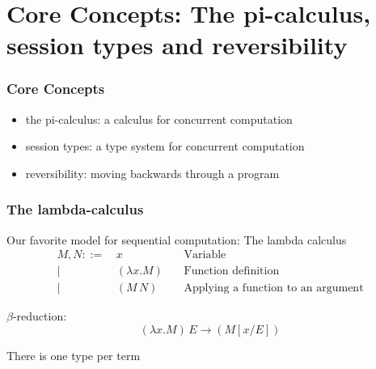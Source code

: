 \documentclass[12pt]{beamer}
\begin{document}
\section{Core Concepts: The pi-calculus, session types and reversibility}


\begin{frame}
\frametitle{Core Concepts}
\begin{center}


\begin{itemize}
    \item the pi-calculus: a calculus for concurrent computation
    \item session types: a type system for concurrent computation
    \item reversibility: moving backwards through a program
\end{itemize}


\end{center}
\end{frame}


\begin{frame}
\frametitle{The lambda-calculus}

Our favorite model for sequential computation: The lambda calculus 
\begingroup
\fontsize{10pt}{12pt}\selectfont
\begin{align*}
M, N ::= \, & x \,\,\, \, \, & \text{Variable}\\
|\,\,\, & (\lambda x. M) \,\,\, \, \, &\text{Function definition}\\
|\,\,\, & (M\, N) \,\,\, \, \, \, \, \, \, &\text{Applying a function to an argument} 
\end{align*}
\endgroup



$\beta$-reduction: 
$$(\lambda x. M) \, E \rightarrow (M[x/E])$$

There is one type per term

\end{frame}
\end{document}
